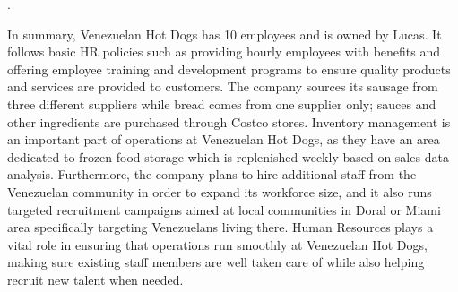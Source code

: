 .

In summary, Venezuelan Hot Dogs has 10 employees and is owned by Lucas. It follows basic HR policies such as providing hourly employees with benefits and offering employee training and development programs to ensure quality products and services are provided to customers. The company sources its sausage from three different suppliers while bread comes from one supplier only; sauces and other ingredients are purchased through Costco stores. Inventory management is an important part of operations at Venezuelan Hot Dogs, as they have an area dedicated to frozen food storage which is replenished weekly based on sales data analysis. Furthermore, the company plans to hire additional staff from the Venezuelan community in order to expand its workforce size, and it also runs targeted recruitment campaigns aimed at local communities in Doral or Miami area specifically targeting Venezuelans living there. Human Resources plays a vital role in ensuring that operations run smoothly at Venezuelan Hot Dogs, making sure existing staff members are well taken care of while also helping recruit new talent when needed.